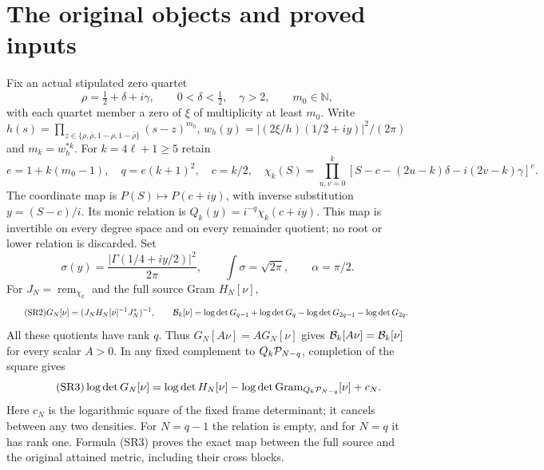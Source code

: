 \section{The original objects and proved inputs}
Fix an actual stipulated zero quartet
\[
 \rho=\tfrac12+\delta+i\gamma,\qquad 0<\delta<\tfrac12,\quad\gamma>2,
 \qquad m_0\in\mathbb N,
\]
with each quartet member a zero of $\xi$ of multiplicity at least $m_0$.
Write $h(s)=\prod_{z\in\{\rho,\bar\rho,1-\rho,1-\bar\rho\}}(s-z)^{m_0}$,
$w_h(y)=|(2\xi/h)(1/2+iy)|^2/(2\pi)$ and $m_k=w_h^{*k}$.
For $k=4\ell+1\ge5$ retain
\begin{equation}\tag{SR1}
 e=1+k(m_0-1),\quad q=e(k+1)^2,\quad c=k/2,\quad
 \chi_k(S)=\prod_{u,v=0}^k
 [S-c-(2u-k)\delta-i(2v-k)\gamma]^e.
\end{equation}
The coordinate map is $P(S)\mapsto P(c+iy)$, with inverse substitution
$y=(S-c)/i$. Its monic relation is $Q_k(y)=i^{-q}\chi_k(c+iy)$.
This map is invertible on every degree space and on every remainder quotient;
no root or lower relation is discarded. Set
\[
 \sigma(y)=\frac{|\Gamma(1/4+iy/2)|^2}{2\pi},\qquad
 \int\sigma=\sqrt{2\pi},\qquad \alpha=\pi/2.
\]
For $J_N=\operatorname{rem}_{\chi_k}$ and the full source Gram $H_N[\nu]$,
\begin{equation}\tag{SR2}
 G_N[\nu]=(J_NH_N[\nu]^{-1}J_N^*)^{-1},\qquad
 \mathcal B_k[\nu]=\log\det G_{q-1}+\log\det G_q
             -\log\det G_{2q-1}-\log\det G_{2q}.
\end{equation}
All these quotients have rank $q$. Thus $G_N[A\nu]=AG_N[\nu]$ gives
$\mathcal B_k[A\nu]=\mathcal B_k[\nu]$ for every scalar $A>0$.
In any fixed complement to $Q_k\mathcal P_{N-q}$, completion of the square gives
\begin{equation}\tag{SR3}
 \log\det G_N[\nu]=\log\det H_N[\nu]
 -\log\det\operatorname{Gram}_{Q_k\mathcal P_{N-q}}[\nu]+c_N.
\end{equation}
Here $c_N$ is the logarithmic square of the fixed frame determinant; it cancels
between any two densities. For $N=q-1$ the relation is empty, and for $N=q$ it
has rank one. Formula (SR3) proves the exact map between the full source and
the original attained metric, including their cross blocks.

